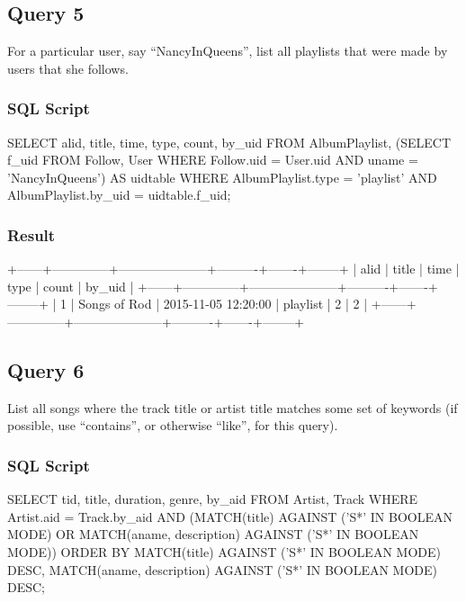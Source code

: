 \documentclass[letterpaper, 12pt]{report}
\begin{document}
	\subsection{Query 5}
	For a particular user, say “NancyInQueens”, list all playlists that were made by users that she follows.
	\subsubsection{SQL Script}
	\begin{spverbatim}
		SELECT alid, title, time, type, count, by_uid FROM AlbumPlaylist,
		(SELECT f_uid FROM Follow, User
		WHERE Follow.uid = User.uid
		AND uname = 'NancyInQueens') AS uidtable
		WHERE AlbumPlaylist.type = 'playlist'
		AND AlbumPlaylist.by_uid = uidtable.f_uid;
	\end{spverbatim}
	\subsubsection{Result}
	\begin{spverbatim}
		+------+--------------+---------------------+----------+-------+--------+
		| alid | title        | time                | type     | count | by_uid |
		+------+--------------+---------------------+----------+-------+--------+
		|    1 | Songs of Rod | 2015-11-05 12:20:00 | playlist |     2 |      2 |
		+------+--------------+---------------------+----------+-------+--------+
	\end{spverbatim}
	
	\subsection{Query 6}
	List all songs where the track title or artist title matches some set of keywords (if possible, use
	``contains'', or otherwise ``like'', for this query).
	
	\subsubsection{SQL Script}
	\begin{spverbatim}
		SELECT tid, title, duration, genre, by_aid FROM Artist, Track 
		WHERE Artist.aid = Track.by_aid
		AND (MATCH(title)
		AGAINST ('S*' IN BOOLEAN MODE)
		OR MATCH(aname, description)
		AGAINST ('S*' IN BOOLEAN MODE))
		ORDER BY MATCH(title)
		AGAINST ('S*' IN BOOLEAN MODE) DESC,
		MATCH(aname, description)
		AGAINST ('S*' IN BOOLEAN MODE) DESC;
	\end{spverbatim}
\end{document}

